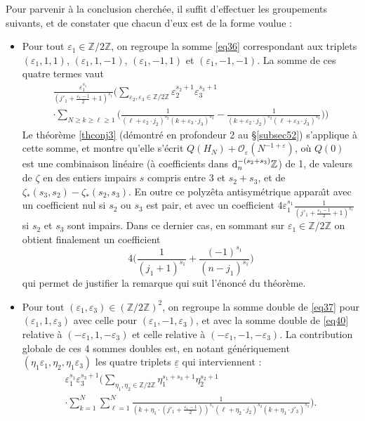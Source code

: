 \documentclass[12pt,francais, reqno]{smfart}
\numberwithin{equation}{section}
\newcommand{\dd}{\textup{d}}
\def\dd{\textup{d}}
\newcommand{\Z}{\mathbb Z}
\newcommand{\gdo}{\mathcal{O}}
\newcommand{\zdzd}{(\Z / 2 \Z)^2}
\newcommand{\zdz}{\Z / 2 \Z}
\newcommand{\eps}{\varepsilon}
\newcommand{\epssoul}{\underline{\eps}}
\newcommand{\jprun}{j'_1+\frac{\eps_1-1}{2}}
\newcommand{\zetaetoile}{\zeta _*}
\begin{document}
\bigskip

Pour parvenir \`a la conclusion cherch\'ee, il suffit d'effectuer les groupements suivants, et de constater que chacun d'eux est de la forme voulue : 
\begin{itemize}
\item Pour tout $\eps_1 \in \zdz$, on regroupe la somme \eqref{eq36} correspondant aux triplets $(\eps_1, 1, 1)$, $(\eps_1, 1, -1)$, $(\eps_1, -1, 1)$ et  $(\eps_1, -1, -1)$. La somme de ces quatre termes vaut 
\begin{multline*} 
\frac{\eps_1^{s_1} }{(\jprun +1)^{s_1}}   
\bigg(\sum_{\eps_2, \eps_3 \in \zdz} \eps_2^{s_2+1} \eps_3^{s_3+1}
\\
\cdot \sum_{N \geq k \geq \ell  \geq 1} \Big( \frac{1}{(\ell+\eps_2 
\cdot j_2)^{s_2}(k+\eps_3 \cdot j_3)^{s_3}} - \frac{1}{(k+\eps_2 \cdot j_2)^{s_2}(\ell+\eps_3 \cdot j_3)^{s_3}} \Big)\bigg)
\end{multline*}
Le th\'eor\`eme \ref{thconj3} (d\'emontr\'e en profondeur 2 au \S \ref{subsec52}) s'applique \`a cette somme, et montre qu'elle s'\'ecrit $Q (H_N) + \gdo_\eps (N^{-1+\eps})$, o\`u $Q(0)$ est une combinaison lin\'eaire (\`a coefficients dans $\dd_n ^{-(s_2+s_3)} \Z$) de 1, de valeurs de $\zeta$ en des entiers impairs $s$ compris entre 3 et $s_2+s_3$, et de $\zetaetoile(s_3, s_2) - \zetaetoile(s_2, s_3)$. En outre ce polyz\^eta antisym\'etrique appara\^{\i}t avec un coefficient nul si $s_2$ ou $s_3$ est pair, et avec un coefficient
$4 \eps_1^{s_1} \frac{1}{(\jprun +1)^{s_1}}   $ si $s_2$ et $s_3$ sont impairs. Dans ce dernier cas, en sommant sur $\eps_1 \in \zdz$ on obtient finalement un coefficient
$$4 \Big(  \frac{1}{(j_1 +1)^{s_1}} +   \frac{(-1)^{s_1}}{(n-j_1) ^{s_1}}  \Big)$$
qui permet de justifier la remarque qui suit l'\'enonc\'e du th\'eor\`eme.
\item Pour tout $(\eps_1, \eps_3)  \in \zdzd$, on regroupe la somme double de \eqref{eq37} pour $(\eps_1, 1 , \eps_3)$ avec celle pour $(\eps_1, -1 , \eps_3)$, et avec  la somme double de \eqref{eq40} relative \`a $(-\eps_1, 1 , -\eps_3)$ et celle relative \`a $(-\eps_1,-1, -\eps_3)$. La contribution globale de ces 4 sommes doubles est, en notant g\'en\'eriquement $(\eta_1\eps_1, \eta_2, \eta_1\eps_3)$ les quatre triplets $\epssoul$ qui interviennent   :  
\begin{multline*}
\eps_1^{s_1}  \eps_3^{s_3+1} \bigg(
\sum_{\eta_1, \eta_2 \in \zdz} 
\eta_1^{s_1+s_3+1} \eta_2 ^{s_2+1} \\
\cdot 
  \sum_{ k=1} ^N   \sum_{ \ell=1} ^N  \frac{1}{(k+\eta_1 \cdot (\jprun))^{s_1}(\ell+\eta_2 \cdot j_2)^{s_2}(k+\eta_1 \cdot j'_3)^{s_3}}\bigg). 

\end{multline*}
\end{itemize}
\end{document}
